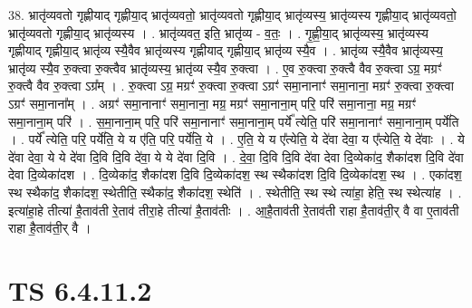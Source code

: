 \documentclass[17pt]{extarticle}
\begin{document}
38. भ्रातृ॑व्यवतो गृह्णीयाद् गृह्णीया॒द् भ्रातृ॑व्यवतो॒ भ्रातृ॑व्यवतो गृह्णीया॒द् भ्रातृ॑व्यस्य॒ भ्रातृ॑व्यस्य गृह्णीया॒द् भ्रातृ॑व्यवतो॒ भ्रातृ॑व्यवतो गृह्णीया॒द् भ्रातृ॑व्यस्य । . भ्रातृ॑व्यवत॒ इति॒ भ्रातृ॑व्य - व॒तः॒ । . गृ॒ह्णी॒या॒द् भ्रातृ॑व्यस्य॒ भ्रातृ॑व्यस्य गृह्णीयाद् गृह्णीया॒द् भ्रातृ॑व्य स्यै॒वैव भ्रातृ॑व्यस्य गृह्णीयाद् गृह्णीया॒द् भ्रातृ॑व्य स्यै॒व । . भ्रातृ॑व्य स्यै॒वैव भ्रातृ॑व्यस्य॒ भ्रातृ॑व्य स्यै॒व रु॒क्त्वा रु॒क्त्वैव भ्रातृ॑व्यस्य॒ भ्रातृ॑व्य स्यै॒व रु॒क्त्वा । . ए॒व रु॒क्त्वा रु॒क्त्वै वैव रु॒क्त्वा ऽग्र॒ मग्रꣳ॑ रु॒क्त्वै वैव रु॒क्त्वा ऽग्र᳚म् । . रु॒क्त्वा ऽग्र॒ मग्रꣳ॑ रु॒क्त्वा रु॒क्त्वा ऽग्रꣳ॑ समा॒नानाꣳ॑ समा॒नाना॒ मग्रꣳ॑ रु॒क्त्वा रु॒क्त्वा ऽग्रꣳ॑ समा॒नाना᳚म् । . अग्रꣳ॑ समा॒नानाꣳ॑ समा॒नाना॒ मग्र॒ मग्रꣳ॑ समा॒नाना॒म् परि॒ परि॑ समा॒नाना॒ मग्र॒ मग्रꣳ॑ समा॒नाना॒म् परि॑ । . स॒मा॒नाना॒म् परि॒ परि॑ समा॒नानाꣳ॑ समा॒नाना॒म् पर्ये᳚ त्येति॒ परि॑ समा॒नानाꣳ॑ समा॒नाना॒म् पर्ये॑ति । . पर्ये᳚ त्येति॒ परि॒ पर्ये॑ति॒ ये य ए॑ति॒ परि॒ पर्ये॑ति॒ ये । . ए॒ति॒ ये य ए᳚त्येति॒ ये दे॑वा देवा॒ य ए᳚त्येति॒ ये दे॑वाः । . ये दे॑वा देवा॒ ये ये दे॑वा दि॒वि दि॒वि दे॑वा॒ ये ये दे॑वा दि॒वि । . दे॒वा॒ दि॒वि दि॒वि दे॑वा देवा दि॒व्येका॑द॒ शैका॑दश दि॒वि दे॑वा देवा दि॒व्येका॑दश । . दि॒व्येका॑द॒ शैका॑दश दि॒वि दि॒व्येका॑दश॒ स्थ स्थैका॑दश दि॒वि दि॒व्येका॑दश॒ स्थ । . एका॑दश॒ स्थ स्थैका॑द॒ शैका॑दश॒ स्थेतीति॒ स्थैका॑द॒ शैका॑दश॒ स्थेति॑ । . स्थेतीति॒ स्थ स्थे त्या॑हा॒ हेति॒ स्थ स्थेत्या॑ह । . इत्या॑हा॒हे तीत्या॑ है॒ताव॑ती रे॒ताव॑ तीरा॒हे तीत्या॑ है॒ताव॑तीः । . आ॒है॒ताव॑ती रे॒ताव॑ती राहा है॒ताव॑ती॒र् वै वा ए॒ताव॑ती राहा है॒ताव॑ती॒र् वै । \newline
\pagebreak
{}

\section{ TS 6.4.11.2 }
\end{document}
